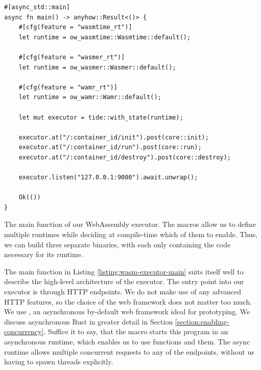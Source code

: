\begin{listing}[ht]
    \begin{verbatim}
#[async_std::main]
async fn main() -> anyhow::Result<()> {
    #[cfg(feature = "wasmtime_rt")]
    let runtime = ow_wasmtime::Wasmtime::default();

    #[cfg(feature = "wasmer_rt")]
    let runtime = ow_wasmer::Wasmer::default();

    #[cfg(feature = "wamr_rt")]
    let runtime = ow_wamr::Wamr::default();

    let mut executor = tide::with_state(runtime);

    executor.at("/:container_id/init").post(core::init);
    executor.at("/:container_id/run").post(core::run);
    executor.at("/:container_id/destroy").post(core::destroy);

    executor.listen("127.0.0.1:9000").await.unwrap();

    Ok(())
}
\end{verbatim}
    \caption{The main function of our WebAssembly executor. The \inl{\#[cfg(feature = "...")]} macros allow us to define multiple runtimes while deciding at compile-time which of them to enable. Thus, we can build three separate binaries, with each only containing the code necessary for its runtime.}
    \label{listing:wasm-executor-main}
\end{listing}

The main function in Listing \ref{listing:wasm-executor-main} suits itself well to describe the high-level architecture of the executor. The entry point into our executor is through HTTP endpoints. We do not make use of any advanced HTTP features, so the choice of the web framework does not matter too much. We use  \cite{Turon2021}, an asynchronous by-default web framework ideal for prototyping. We discuss asynchronous Rust in greater detail in Section \ref{section:enabling-concurrency}. Suffice it to say, that the  macro starts this program in an asynchronous runtime, which enables us to use  functions and  them. The async runtime allows multiple concurrent requests to any of the endpoints, without us having to spawn threads explicitly.

